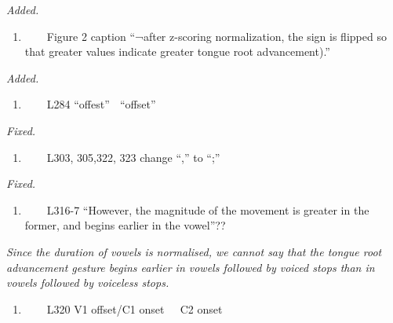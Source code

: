 \documentclass[]{article}
\providecommand{\tightlist}{%
  \setlength{\itemsep}{0pt}\setlength{\parskip}{0pt}}
\begin{document}
\begin{adjustwidth}{1cm}{} \textit{
Added.
} \end{adjustwidth}

\begin{enumerate}
\def\labelenumi{\arabic{enumi}.}
\setcounter{enumi}{8}
\tightlist
\item
  ~~~~Figure 2 caption ``¬after z-scoring normalization, the sign is
  flipped so that greater values indicate greater tongue root
  advancement).''
\end{enumerate}

\begin{adjustwidth}{1cm}{} \textit{
Added.
} \end{adjustwidth}

\begin{enumerate}
\def\labelenumi{\arabic{enumi}.}
\setcounter{enumi}{9}
\tightlist
\item
  ~~~~L284 ``offest''  ``offset''
\end{enumerate}

\begin{adjustwidth}{1cm}{} \textit{
Fixed.
} \end{adjustwidth}

\begin{enumerate}
\def\labelenumi{\arabic{enumi}.}
\setcounter{enumi}{10}
\tightlist
\item
  ~~~~L303, 305,322, 323 change ``,'' to ``;''
\end{enumerate}

\begin{adjustwidth}{1cm}{} \textit{
Fixed.
} \end{adjustwidth}

\begin{enumerate}
\def\labelenumi{\arabic{enumi}.}
\setcounter{enumi}{11}
\tightlist
\item
  ~~~~L316-7 ``However, the magnitude of the movement is greater in the
  former, and begins earlier in the vowel''??
\end{enumerate}

\begin{adjustwidth}{1cm}{} \textit{
Since the duration of vowels is normalised, we cannot say that the tongue root advancement gesture begins earlier in vowels followed by voiced stops than in vowels followed by voiceless stops.
} \end{adjustwidth}

\begin{enumerate}
\def\labelenumi{\arabic{enumi}.}
\setcounter{enumi}{12}
\tightlist
\item
  ~~~~L320 V1 offset/C1 onset ~ C2 onset
\end{enumerate}
\end{document}
